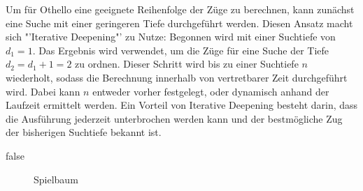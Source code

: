 Um für Othello eine geeignete Reihenfolge der Züge zu berechnen, kann zunächst eine Suche mit einer geringeren Tiefe durchgeführt werden.
Diesen Ansatz macht sich "'Iterative Deepening"' zu Nutze:
Begonnen wird mit einer Suchtiefe von $d_1=1$.
Das Ergebnis wird verwendet, um die Züge für eine Suche der Tiefe $d_2=d_1+1=2$ zu ordnen.
Dieser Schritt wird bis zu einer Suchtiefe $n$ wiederholt, sodass die Berechnung innerhalb von vertretbarer Zeit durchgeführt wird.
Dabei kann $n$ entweder vorher festgelegt, oder dynamisch anhand der Laufzeit ermittelt werden.
Ein Vorteil von Iterative Deepening besteht darin, dass die Ausführung jederzeit unterbrochen werden kann und der bestmögliche Zug der bisherigen Suchtiefe bekannt ist.
\cite{alphabetaefficiency}

\ifx false
\begin{figure}[]
    \centering
    \caption{Spielbaum}
    \label{fig:game_tree}
\end{figure}
\fi


